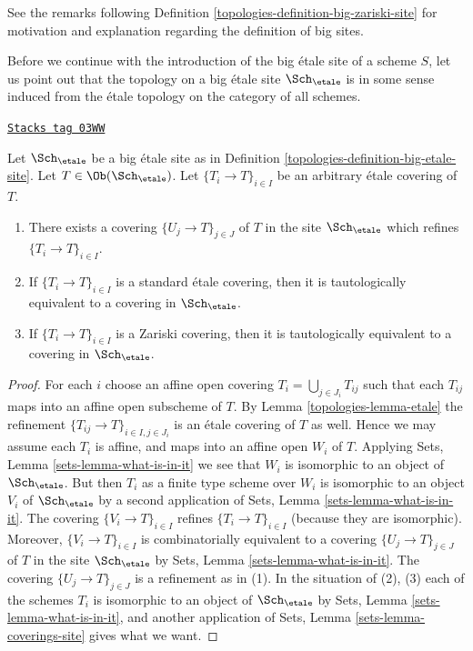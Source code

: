 See the remarks following Definition \ref{topologies-definition-big-zariski-site}
for motivation and explanation regarding the definition of big sites.

\medskip\noindent
Before we continue with the introduction of the big \'etale site of
a scheme $S$, let us point out that the topology on a big \'etale site
$\Sch_\etale$ is in some sense induced from the \'etale
topology on the category of all schemes.

\begin{lemma}
\label{topologies-lemma-etale-induced}
\href{https://stacks.math.columbia.edu/tag/03WW}{\texttt{Stacks tag 03WW}}

Let $\Sch_\etale$ be a big \'etale site as in
Definition \ref{topologies-definition-big-etale-site}.
Let $T \in \Ob(\Sch_\etale)$.
Let $\{T_i \to T\}_{i \in I}$ be an arbitrary \'etale covering of $T$.
\begin{enumerate}
\item There exists a covering $\{U_j \to T\}_{j \in J}$ of $T$ in the site
$\Sch_\etale$ which refines $\{T_i \to T\}_{i \in I}$.
\item If $\{T_i \to T\}_{i \in I}$ is a standard \'etale covering, then
it is tautologically equivalent to a covering in $\Sch_\etale$.
\item If $\{T_i \to T\}_{i \in I}$ is a Zariski covering, then
it is tautologically equivalent to a covering in $\Sch_\etale$.
\end{enumerate}
\end{lemma}

\begin{proof}

For each $i$ choose an affine open covering $T_i = \bigcup_{j \in J_i} T_{ij}$
such that each $T_{ij}$ maps into an affine open subscheme of $T$. By
Lemma \ref{topologies-lemma-etale}
the refinement $\{T_{ij} \to T\}_{i \in I, j \in J_i}$ is an \'etale covering
of $T$ as well. Hence we may assume each $T_i$ is affine, and maps into
an affine open $W_i$ of $T$. Applying
Sets, Lemma \ref{sets-lemma-what-is-in-it}
we see that $W_i$ is isomorphic to an object of $\Sch_\etale$.
But then $T_i$ as a finite type scheme over $W_i$
is isomorphic to an object $V_i$ of $\Sch_\etale$ by a second
application of
Sets, Lemma \ref{sets-lemma-what-is-in-it}.
The covering $\{V_i \to T\}_{i \in I}$ refines $\{T_i \to T\}_{i \in I}$
(because they are isomorphic).
Moreover, $\{V_i \to T\}_{i \in I}$ is combinatorially equivalent to a
covering $\{U_j \to T\}_{j \in J}$ of $T$ in the site
$\Sch_\etale$ by
Sets, Lemma \ref{sets-lemma-what-is-in-it}.
The covering $\{U_j \to T\}_{j \in J}$ is a refinement as in (1).
In the situation of (2), (3) each of the
schemes $T_i$ is isomorphic to an object of $\Sch_\etale$ by
Sets, Lemma \ref{sets-lemma-what-is-in-it},
and another application of
Sets, Lemma \ref{sets-lemma-coverings-site}
gives what we want.
\end{proof}

